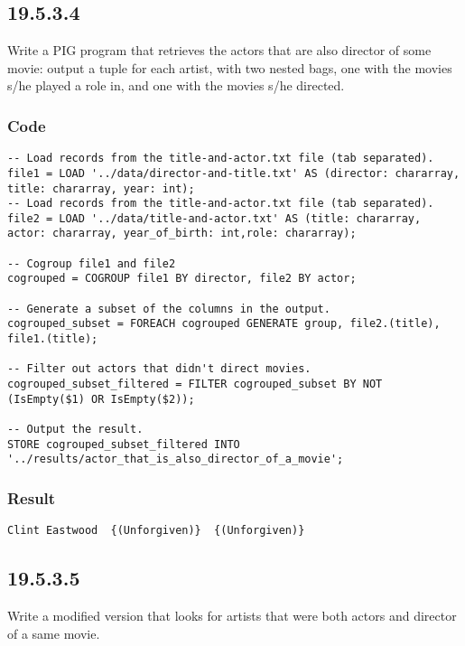 \documentclass[a4paper, notitlepage]{article}
\begin{document}
\subsection{19.5.3.4}

Write a PIG program that retrieves the actors that are also director of some movie: output a tuple for each artist, with two nested bags, one with the movies s/he played a role in, and one with the movies s/he directed.

\subsubsection{Code}

\begin{lstlisting}
-- Load records from the title-and-actor.txt file (tab separated).
file1 = LOAD '../data/director-and-title.txt' AS (director: chararray, title: chararray, year: int);
-- Load records from the title-and-actor.txt file (tab separated).
file2 = LOAD '../data/title-and-actor.txt' AS (title: chararray, actor: chararray, year_of_birth: int,role: chararray);

-- Cogroup file1 and file2
cogrouped = COGROUP file1 BY director, file2 BY actor;

-- Generate a subset of the columns in the output.
cogrouped_subset = FOREACH cogrouped GENERATE group, file2.(title), file1.(title);

-- Filter out actors that didn't direct movies.
cogrouped_subset_filtered = FILTER cogrouped_subset BY NOT (IsEmpty($1) OR IsEmpty($2));

-- Output the result.
STORE cogrouped_subset_filtered INTO '../results/actor_that_is_also_director_of_a_movie';
\end{lstlisting}

\subsubsection{Result}

\begin{lstlisting}
Clint Eastwood	{(Unforgiven)}	{(Unforgiven)}
\end{lstlisting}

\subsection{19.5.3.5}

Write a modified version that looks for artists that were both actors and director of a same movie.
\end{document}
